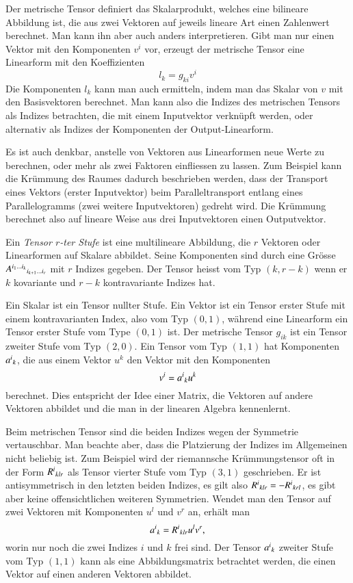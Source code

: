 Der metrische Tensor definiert das Skalarprodukt, welches eine bilineare
Abbildung ist, die aus zwei Vektoren auf jeweils lineare Art einen
Zahlenwert berechnet.
Man kann ihn aber auch anders interpretieren.
Gibt man nur einen Vektor mit den Komponenten $v^i$ vor, erzeugt der
metrische Tensor eine Linearform mit den Koeffizienten
\[
l_k = g_{ki}v^i
\]
Die Komponenten $l_k$ kann man auch ermitteln, indem man das Skalar
von $v$ mit den Basisvektoren berechnet.
Man kann also die Indizes des metrischen Tensors als Indizes betrachten,
die mit einem Inputvektor verknüpft werden, oder alternativ als Indizes
der Komponenten der Output-Linearform.

Es ist auch denkbar, anstelle von Vektoren aus Linearformen
neue Werte zu berechnen, oder mehr als zwei Faktoren einfliessen zu
lassen.
Zum Beispiel kann die Krümmung des Raumes dadurch beschrieben werden,
dass der Transport eines Vektors (erster Inputvektor) beim Paralleltransport
entlang eines Parallelogramms (zwei weitere Inputvektoren) gedreht wird.
Die Krümmung berechnet also auf lineare Weise aus drei Inputvektoren
einen Outputvektor.

\begin{definition}[Tensor]
%
Ein {\em Tensor $r$-ter Stufe} ist eine multilineare Abbildung, die
$r$ Vektoren oder Linearformen auf Skalare abbildet.
Seine Komponenten sind durch eine Grösse
$A^{i_1\dots i_k}\mathstrut_{i_{k+1}\dots i_r}$
mit $r$ Indizes gegeben.
Der Tensor heisst vom Typ $(k,r-k)$ wenn er $k$ kovariante und 
$r-k$ kontravariante Indizes hat.
\end{definition}

Ein Skalar ist ein Tensor nullter Stufe.
Ein Vektor ist ein Tensor erster Stufe mit einem kontravarianten Index,
also vom Typ $(0,1)$, während eine Linearform ein Tensor erster
Stufe vom Type $(0,1)$ ist.
Der metrische Tensor $g_{ik}$ ist ein Tensor zweiter Stufe vom Typ
$(2,0)$.
Ein Tensor vom Typ $(1,1)$ hat Komponenten $a^i\mathstrut_k$, die aus
einem Vektor $u^k$ den Vektor mit den Komponenten
\[
v^i = a^i\mathstrut_k u^k
\]
berechnet.
Dies entspricht der Idee einer Matrix, die Vektoren auf andere 
Vektoren abbildet und die man in der linearen Algebra kennenlernt.

Beim metrischen Tensor sind die beiden Indizes wegen der Symmetrie
vertauschbar.
Man beachte aber, dass die Platzierung der Indizes im Allgemeinen nicht
beliebig ist.
Zum Beispiel wird der riemannsche Krümmungstensor oft in der Form
\(
R^i\mathstrut_{klr}
\)
%
als Tensor vierter Stufe vom Typ $(3,1)$ geschrieben.
Er ist antisymmetrisch in den letzten beiden Indizes, es gilt also
\(
R^i\mathstrut_{klr}
=
-
R^i\mathstrut_{krl}
\),
es gibt aber keine offensichtlichen weiteren Symmetrien.
Wendet man den Tensor auf zwei Vektoren mit Komponenten $u^l$ und
$v^r$ an, erhält man
\[
a^i\mathstrut_k
=
R^i\mathstrut_{klr}u^lv^r,
\]
worin nur noch die zwei Indizes $i$ und $k$ frei sind.
Der Tensor $a^i\mathstrut_k$ zweiter Stufe vom Typ $(1,1)$
kann als eine Abbildungsmatrix betrachtet werden,
die einen Vektor auf einen anderen Vektoren abbildet.

